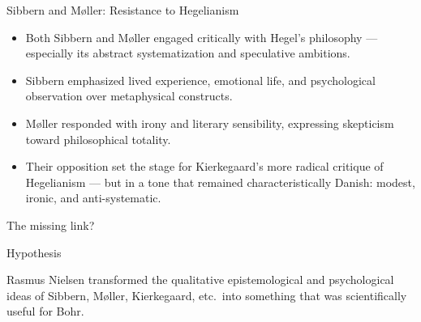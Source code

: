 \documentclass[fleqn]{beamer}
\begin{document}
\begin{frame}{Sibbern and Møller: Resistance to Hegelianism}
  
\begin{itemize}
\item Both Sibbern and Møller engaged critically with Hegel’s
  philosophy — especially its abstract systematization and speculative
  ambitions.
\item Sibbern emphasized lived experience, emotional life, and
  psychological observation over metaphysical constructs.
\item Møller responded with irony and literary sensibility, expressing
  skepticism toward philosophical totality.
\item Their opposition set the stage for Kierkegaard's more radical
  critique of Hegelianism — but in a tone that remained
  characteristically Danish: modest, ironic, and anti-systematic.
\end{itemize}

\end{frame}

\begin{frame}{\mbox{}}

\Huge The missing link? 


\end{frame}


\begin{frame}{Hypothesis}

  Rasmus Nielsen transformed the qualitative epistemological and
  psychological ideas of Sibbern, Møller, Kierkegaard, etc.\ into
  something that was scientifically useful for Bohr.

  \vspace{2em}


\end{frame}
\end{document}
